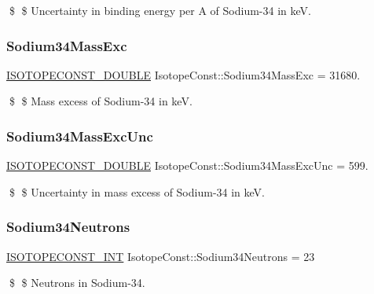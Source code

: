 \$ \$ Uncertainty in binding energy per A of Sodium-\/34 in keV. \mbox{\label{group___isotope_const-_sodium-_na34_gac26d554a5c40d0ffd14dd63371053977}} 
\subsubsection{\texorpdfstring{Sodium34\+Mass\+Exc}{Sodium34MassExc}}
{\footnotesize\ttfamily \mbox{\hyperlink{group___isotope_const-_macros_ga8f45a7272ce02c0b4c65c44636ed719a}{I\+S\+O\+T\+O\+P\+E\+C\+O\+N\+S\+T\+\_\+\+D\+O\+U\+B\+LE}} Isotope\+Const\+::\+Sodium34\+Mass\+Exc = 31680.}

\$ \$ Mass excess of Sodium-\/34 in keV. \mbox{\label{group___isotope_const-_sodium-_na34_ga057dcb16c03aee23eef35b7854e5387e}} 
\subsubsection{\texorpdfstring{Sodium34\+Mass\+Exc\+Unc}{Sodium34MassExcUnc}}
{\footnotesize\ttfamily \mbox{\hyperlink{group___isotope_const-_macros_ga8f45a7272ce02c0b4c65c44636ed719a}{I\+S\+O\+T\+O\+P\+E\+C\+O\+N\+S\+T\+\_\+\+D\+O\+U\+B\+LE}} Isotope\+Const\+::\+Sodium34\+Mass\+Exc\+Unc = 599.}

\$ \$ Uncertainty in mass excess of Sodium-\/34 in keV. \mbox{\label{group___isotope_const-_sodium-_na34_gae288e14214f71185f9490577456a6245}} 
\subsubsection{\texorpdfstring{Sodium34\+Neutrons}{Sodium34Neutrons}}
{\footnotesize\ttfamily \mbox{\hyperlink{group___isotope_const-_macros_ga5f18360b3e99483a35c32d789e62621c}{I\+S\+O\+T\+O\+P\+E\+C\+O\+N\+S\+T\+\_\+\+I\+NT}} Isotope\+Const\+::\+Sodium34\+Neutrons = 23}

\$ \$ Neutrons in Sodium-\/34. \mbox{\label{group___isotope_const-_sodium-_na34_gadebdfc018fbb123c1482224141387be4}} 
